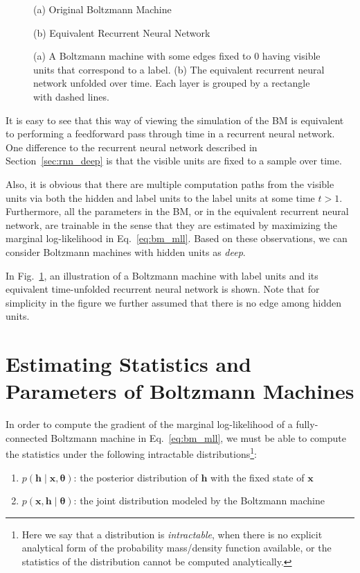 \documentclass[dissertation,nocontribution,draft*]{aaltoseries}
\newcommand{\vect}[1]{\mathbf{#1}}
\newcommand{\vects}[1]{\boldsymbol{#1}}
\newcommand{\vh}[0]{\vect{h}}
\newcommand{\vx}[0]{\vect{x}}
\newcommand{\TT}[0]{{\vects{\theta}}}
\begin{document}
\begin{figure}[t]
    \vspace{2mm}
    \begin{minipage}{0.48\textwidth}
        \centering
        \small
        (a) Original Boltzmann Machine
    \end{minipage}
    \begin{minipage}{0.48\textwidth}
        \centering
        \small
        (b) Equivalent Recurrent Neural Network
    \end{minipage}
    \caption{(a) A Boltzmann machine with some edges fixed
    to $0$ having visible units that correspond to a label.
    (b) The equivalent recurrent neural network unfolded over
    time. Each layer is grouped by a rectangle with dashed
    lines.}
    \label{fig:bm_rnn}
\end{figure}

It is easy to see that this way of viewing the simulation of
the BM is equivalent to performing a feedforward pass
through time in a recurrent neural network. One difference
to the recurrent neural network described in
Section~\ref{sec:rnn_deep} is that the visible units are
fixed to a sample over time. 

Also, it is obvious that there are multiple computation
paths from the visible units via both the hidden and label
units to the label units at some time $t > 1$. Furthermore,
all the parameters in the BM, or in the equivalent recurrent
neural network, are trainable in the sense that they are
estimated by maximizing the marginal log-likelihood in
Eq.~\eqref{eq:bm_mll}. Based on these observations, we
can consider Boltzmann machines with hidden units
as \textit{deep}.

In Fig.~\ref{fig:bm_rnn}, an illustration of a Boltzmann
machine with label units and its equivalent time-unfolded
recurrent neural network is shown. Note that for
simplicity in the figure we further assumed that there is
no edge among hidden units.


\section{Estimating Statistics and Parameters of Boltzmann
Machines}
\label{sec:estimation_bm}

In order to compute the gradient of the marginal
log-likelihood of a fully-connected Boltzmann machine in
Eq.~\eqref{eq:bm_mll}, we must be able to compute the
statistics under the following intractable
distributions\footnote{Here we say that a distribution is
\textit{intractable}, when there is no explicit analytical
form of the probability mass/density function available, or
the statistics of the distribution cannot be computed
analytically.}:
\begin{enumerate}
    \itemsep 0em
    \item $p(\vh \mid \vx, \TT)$: the posterior distribution
        of $\vh$ with the fixed state of $\vx$
    \item $p(\vx, \vh \mid \TT)$: the joint distribution
        modeled by the Boltzmann machine
\end{enumerate}
\end{document}
